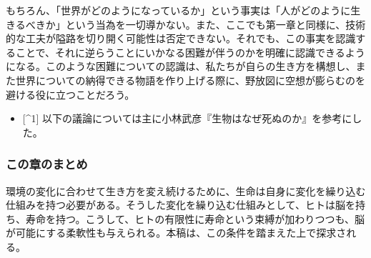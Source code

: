 もちろん、「世界がどのようになっているか」という事実は「人がどのように生きるべきか」という当為を一切導かない。また、ここでも第一章と同様に、技術的な工夫が隘路を切り開く可能性は否定できない。それでも、この事実を認識することで、それに逆らうことにいかなる困難が伴うのかを明確に認識できるようになる。このような困難についての認識は、私たちが自らの生き方を構想し、また世界についての納得できる物語を作り上げる際に、野放図に空想が膨らむのを避ける役に立つことだろう。

\begin{itemize}
\tightlist
\item
  {[}\^{}1{]}
  以下の議論については主に小林武彦『生物はなぜ死ぬのか』を参考にした。
\end{itemize}

\subsubsection{この章のまとめ}\label{ux3053ux306eux7ae0ux306eux307eux3068ux3081}

環境の変化に合わせて生き方を変え続けるために、生命は自身に変化を繰り込む仕組みを持つ必要がある。そうした変化を繰り込む仕組みとして、ヒトは脳を持ち、寿命を持つ。こうして、ヒトの有限性に寿命という束縛が加わりつつも、脳が可能にする柔軟性も与えられる。本稿は、この条件を踏まえた上で探求される。
